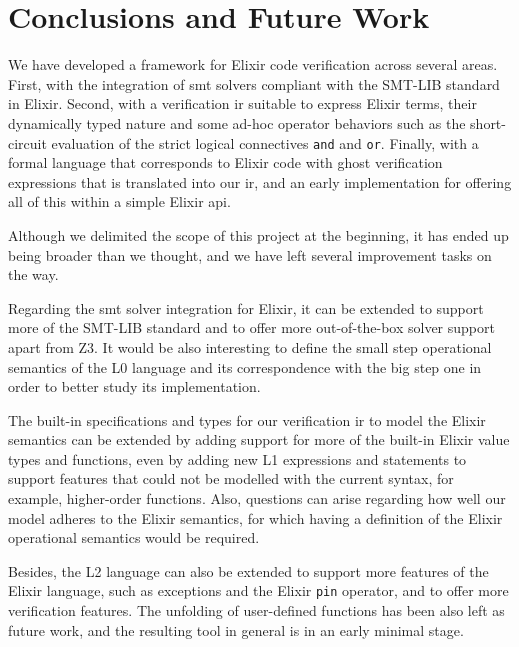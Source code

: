\chapter{Conclusions and Future Work}
\label{cap:conclusions}


We have developed a framework for Elixir code verification across several areas.
First, with the integration of \acrshort{smt} solvers compliant with the SMT-LIB
standard in Elixir. Second, with a verification \gls{ir} suitable to express
Elixir terms, their dynamically typed nature and some ad-hoc operator behaviors
such as the short-circuit evaluation of the strict logical connectives
\verb|and| and \verb|or|. Finally, with a formal language that corresponds to 
Elixir code with ghost verification expressions that is translated into our
\gls{ir}, and an early implementation for offering all of this within a simple 
Elixir \gls{api}.

Although we delimited the scope of this project at the beginning, it has ended
up being broader than we thought, and we have left several improvement tasks on
the way.

Regarding the \acrshort{smt} solver integration for Elixir, it can be extended
to support more of the SMT-LIB standard and to offer more out-of-the-box solver 
support apart from Z3. It would be also interesting to define the small step 
operational semantics of the L0 language and its correspondence with the big
step one in order to better study its implementation.

The built-in specifications and types for our verification \gls{ir} to model the
Elixir semantics can be extended by adding support for more of the built-in
Elixir value types and functions, even by adding new L1 expressions and
statements to support features that could not be modelled with the current
syntax, for example, higher-order functions. Also, questions can arise regarding
how well our model adheres to the Elixir semantics, for which having a
definition of the Elixir operational semantics would be required.

Besides, the L2 language can also be extended to support more features of the
Elixir language, such as exceptions and the Elixir \verb|pin| operator, and to
offer more verification features. The unfolding of user-defined functions has
been also left as future work, and the resulting tool in general is in an early
minimal stage.


